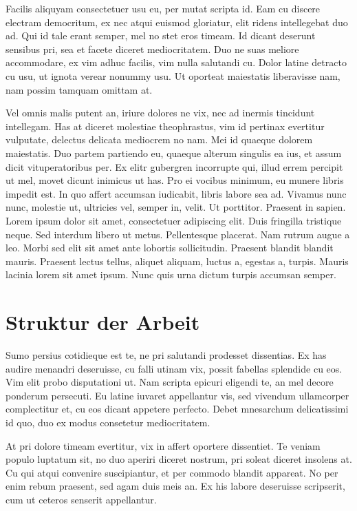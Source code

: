 Facilis aliquyam consectetuer usu eu, per mutat scripta id. Eam cu discere electram democritum, ex nec atqui euismod gloriatur, elit ridens intellegebat duo ad. Qui id tale erant semper, mel no stet eros timeam. Id dicant deserunt sensibus pri, sea et facete diceret mediocritatem. Duo ne suas meliore accommodare, ex vim adhuc facilis, vim nulla salutandi cu. Dolor latine detracto cu usu, ut ignota verear nonummy usu. Ut oporteat maiestatis liberavisse nam, nam possim tamquam omittam at.

Vel omnis malis putent an, iriure dolores ne vix, nec ad inermis tincidunt intellegam. Has at diceret molestiae theophrastus, vim id pertinax evertitur vulputate, delectus delicata mediocrem no nam. Mei id quaeque dolorem maiestatis. Duo partem partiendo eu, quaeque alterum singulis ea ius, et assum dicit vituperatoribus per. Ex elitr gubergren incorrupte qui, illud errem percipit ut mel, movet dicunt inimicus ut has. Pro ei vocibus minimum, eu munere libris impedit est. In quo affert accumsan iudicabit, libris labore sea ad. Vivamus nunc nunc, molestie ut, ultricies vel, semper in, velit. Ut porttitor. Praesent in sapien. Lorem ipsum dolor sit amet, consectetuer adipiscing elit. Duis fringilla tristique neque. Sed interdum libero ut metus. Pellentesque placerat. Nam rutrum augue a leo. Morbi sed elit sit amet ante lobortis sollicitudin. Praesent blandit blandit mauris. Praesent lectus tellus, aliquet aliquam, luctus a, egestas a, turpis. Mauris lacinia lorem sit amet ipsum. Nunc quis urna dictum turpis accumsan semper.


\section{Struktur der Arbeit}
\label{einleitung_vorgehen}
Sumo persius cotidieque est te, ne pri salutandi prodesset dissentias. Ex has audire menandri deseruisse, cu falli utinam vix, possit fabellas splendide cu eos. Vim elit probo disputationi ut. Nam scripta epicuri eligendi te, an mel decore ponderum persecuti. Eu latine iuvaret appellantur vis, sed vivendum ullamcorper complectitur et, cu eos dicant appetere perfecto. Debet mnesarchum delicatissimi id quo, duo ex modus consetetur mediocritatem.

At pri dolore timeam evertitur, vix in affert oportere dissentiet. Te veniam populo luptatum sit, no duo aperiri diceret nostrum, pri soleat diceret insolens at. Cu qui atqui convenire suscipiantur, et per commodo blandit appareat. No per enim rebum praesent, sed agam duis meis an. Ex his labore deseruisse scripserit, cum ut ceteros senserit appellantur.

